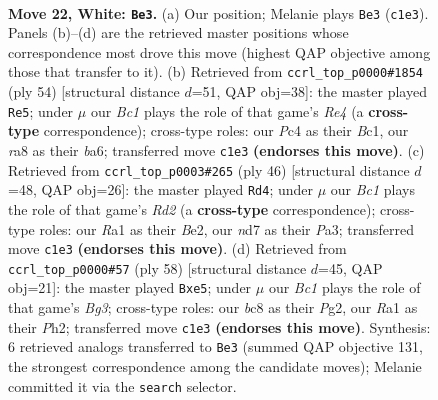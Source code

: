 \documentclass[11pt]{article}
\begin{document}
\clearpage

\begin{figure}[p]\centering
\begin{subfigure}{0.46\textwidth}\centering
\resizebox{\linewidth}{!}{%
\newchessgame
\chessboard[
  setfen={r1b3k1/3n4/1p4p1/2p2p2/2P2P1p/p1P5/P5PP/R1BB2K1 w - - 0 22},
  showmover=false,
  pgfstyle=straightmove, color=movearrow, markmove={c1-e3}
]}
\caption{}
\end{subfigure}\hfill
\begin{subfigure}{0.46\textwidth}\centering
\resizebox{\linewidth}{!}{%
\newchessgame
\chessboard[
  setfen={r5k1/5pp1/b7/5n2/p1p1RP1p/7P/BPP2KP1/2B5 w - - 0 28},
  showmover=false,
  pgfstyle=straightmove, color=movearrow, markmove={e4-e5}
]}
\caption{}
\end{subfigure}
\\[4pt]
\begin{subfigure}{0.46\textwidth}\centering
\resizebox{\linewidth}{!}{%
\newchessgame
\chessboard[
  setfen={4r1k1/1p1n1pp1/2p1b2p/8/p4B1P/P7/1PPRBPP1/6K1 w - - 7 24},
  showmover=false,
  pgfstyle=straightmove, color=movearrow, markmove={d2-d4}
]}
\caption{}
\end{subfigure}\hfill
\begin{subfigure}{0.46\textwidth}\centering
\resizebox{\linewidth}{!}{%
\newchessgame
\chessboard[
  setfen={b3k2r/5ppp/p7/3npP2/Pp6/1N4B1/1PP3PP/2R3K1 w k - 0 30},
  showmover=false,
  pgfstyle=straightmove, color=movearrow, markmove={g3-e5}
]}
\caption{}
\end{subfigure}
\caption{\textbf{Move 22, White: \texttt{Be3}.} (a) Our position; Melanie plays \texttt{Be3} (\texttt{c1e3}). Panels (b)--(d) are the retrieved master positions whose correspondence most drove this move (highest QAP objective among those that transfer to it). (b) Retrieved from \texttt{ccrl\_top\_p0000\#1854} (ply 54) [structural distance $d$=51, QAP obj=38]: the master played \texttt{Re5}; under $\mu$ our \emph{Bc1} plays the role of that game's \emph{Re4} (a \textbf{cross-type} correspondence); cross-type roles: our \emph{P}c4 as their \emph{B}c1, our \emph{r}a8 as their \emph{b}a6; transferred move \texttt{c1e3} \textbf{(endorses this move)}. (c) Retrieved from \texttt{ccrl\_top\_p0003\#265} (ply 46) [structural distance $d$=48, QAP obj=26]: the master played \texttt{Rd4}; under $\mu$ our \emph{Bc1} plays the role of that game's \emph{Rd2} (a \textbf{cross-type} correspondence); cross-type roles: our \emph{R}a1 as their \emph{B}e2, our \emph{n}d7 as their \emph{P}a3; transferred move \texttt{c1e3} \textbf{(endorses this move)}. (d) Retrieved from \texttt{ccrl\_top\_p0000\#57} (ply 58) [structural distance $d$=45, QAP obj=21]: the master played \texttt{Bxe5}; under $\mu$ our \emph{Bc1} plays the role of that game's \emph{Bg3}; cross-type roles: our \emph{b}c8 as their \emph{P}g2, our \emph{R}a1 as their \emph{P}h2; transferred move \texttt{c1e3} \textbf{(endorses this move)}. Synthesis: 6 retrieved analogs transferred to \texttt{Be3} (summed QAP objective 131, the strongest correspondence among the candidate moves); Melanie committed it via the \texttt{search} selector.}
\label{fig:thought-m42}
\end{figure}
\end{document}
